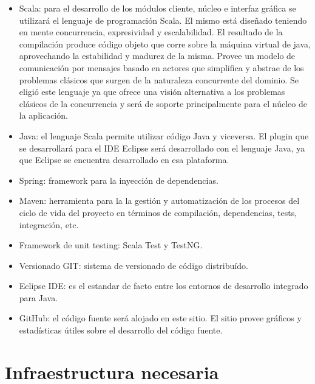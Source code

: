 \documentclass[12pt,a4paper]{article}
\begin{document}
	\begin{itemize}
	
	\item Scala: para el desarrollo de los módulos cliente, núcleo e interfaz gráfica se utilizará el lenguaje de programación Scala. El mismo está diseñado teniendo en mente concurrencia, expresividad y escalabilidad. El resultado de la compilación produce código objeto que corre sobre la máquina virtual de java, aprovechando la estabilidad y madurez de la misma. Provee un modelo de comunicación por mensajes basado en actores que simplifica y abstrae de los problemas clásicos que surgen de la naturaleza concurrente del dominio.
Se eligió este lenguaje ya que ofrece una visión alternativa a los problemas clásicos de la concurrencia y será de soporte principalmente para el núcleo de la aplicación.

	\item Java: el lenguaje Scala permite utilizar código Java y viceversa. El plugin que se desarrollará para el IDE Eclipse será desarrollado con el lenguaje Java, ya que Eclipse se encuentra desarrollado en esa plataforma.

	\item Spring: framework para la inyección de dependencias.

	\item Maven: herramienta para la la gestión y automatización de los procesos del ciclo de vida del proyecto en términos de compilación, dependencias, tests, integración, etc.

	\item Framework de unit testing: Scala Test y TestNG.

	\item Versionado GIT: sistema de versionado de código distribuído.

	\item Eclipse IDE: es el estandar de facto entre los entornos de desarrollo integrado para Java.

	\item GitHub: el código fuente será alojado en este sitio. El sitio provee gráficos y estadísticas útiles sobre el desarrollo del código fuente.	

	\end{itemize}

	
	\section{Infraestructura necesaria}
\end{document}
